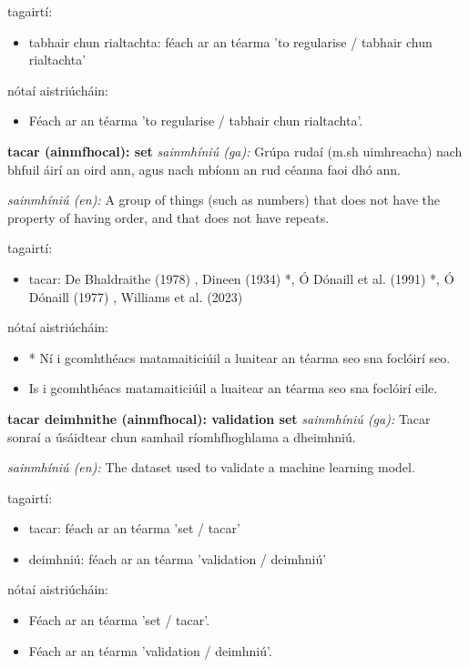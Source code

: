 \documentclass{article}
\begin{document}
tagairtí:
\begin{itemize}
	\item tabhair chun rialtachta: féach ar an téarma 'to regularise / tabhair chun rialtachta'
\end{itemize}

nótaí aistriúcháin:
\begin{itemize}
	\item Féach ar an téarma 'to regularise / tabhair chun rialtachta'.
\end{itemize}


\textbf{tacar (ainmfhocal): set}
\textit{sainmhíniú (ga):} Grúpa rudaí (m.sh uimhreacha) nach bhfuil áirí an oird ann, agus nach mbíonn an rud céanna faoi dhó ann.

\textit{sainmhíniú (en):} A group of things (such as numbers) that does not have the property of having order, and that does not have repeats.

tagairtí:
\begin{itemize}
	\item tacar: De Bhaldraithe (1978) \cite{de-bhaldraithe}, Dineen (1934) \cite{dineen}*, Ó Dónaill et al. (1991) \cite{focloir-beag}*, Ó Dónaill (1977) \cite{odonaill}, Williams et al. (2023) \cite{storchiste}
\end{itemize}

nótaí aistriúcháin:
\begin{itemize}
	\item * Ní i gcomhthéacs matamaiticiúil a luaitear an téarma seo sna foclóirí seo.
	\item Is i gcomhthéacs matamaiticiúil a luaitear an téarma seo sna foclóirí eile.
\end{itemize}


\textbf{tacar deimhnithe (ainmfhocal): validation set}
\textit{sainmhíniú (ga):} Tacar sonraí a úsáidtear chun samhail ríomhfhoghlama a dheimhniú.

\textit{sainmhíniú (en):} The dataset used to validate a machine learning model.

tagairtí:
\begin{itemize}
	\item tacar: féach ar an téarma 'set / tacar'
	\item deimhniú: féach ar an téarma 'validation / deimhniú'
\end{itemize}

nótaí aistriúcháin:
\begin{itemize}
	\item Féach ar an téarma 'set / tacar'.
	\item Féach ar an téarma 'validation / deimhniú'.
\end{itemize}
\end{document}
